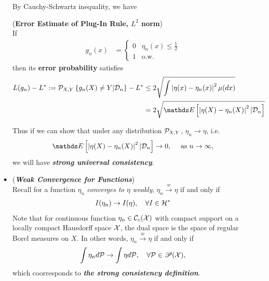 \documentclass[11pt]{article}
\begin{document}
\begin{itemize}
By Cauchy-Schwartz inequality, we have
\begin{corollary}(\textbf{Error Estimate of Plug-In Rule, $L^2$ norm}) \citep{devroye2013probabilistic} \\
If \begin{align*}
g_n(x) &= \left\{ \begin{array}{cc}
0 & \eta_n(x) \le \frac{1}{2}\\
1 & \text{o.w.}
\end{array}
\right.
\end{align*} then its \textbf{error probability} satisfies
\begin{align}
L(g_n) - L^{*}:= \cP_{X,Y}\set{g_n(X) \neq Y | \cD_n} - L^{*} &\le 2 \sqrt{\int \abs{\eta(x) - \eta_n(x)}^2 \mu(dx)} \nonumber\\
&=2\sqrt{\E{}{\abs{\eta(X) - \eta_n(X)}^2 | \cD_n}} \label{eqn: plug_in_error_estimate_l1}
\end{align}
\end{corollary}

Thus if we can show that under any distribution ${\mathcal P}_{X,Y}$, $\eta_n \rightarrow \eta$, i.e.
\begin{align*}
\E{}{\abs{\eta(X) - \eta_n(X)}^2 | \cD_n} \rightarrow 0, \quad \text{ as }n\rightarrow \infty,
\end{align*} we will have \emph{\textbf{strong universal consistency}}.

\item \begin{remark} (\emph{\textbf{Weak Convergence for Functions}})\\
Recall for a function $\eta_n$ \emph{converges to $\eta$ weakly}, $\eta_n \stackrel{w}{\rightarrow} \eta$ if and only if 
\begin{align*}
I(\eta_n) \rightarrow I(\eta), \quad \forall I \in {\mathcal H}^{*}
\end{align*} Note that for continuous function $\eta_n \in {\mathcal C}_c({\mathcal X})$ with compact support on a locally compact Hausdorff space ${\mathcal X}$, the dual space is the space of regular Borel measures on $X$. In other words, $\eta_n \stackrel{w}{\rightarrow} \eta$ if and only if 
\begin{align*}
\int \eta_n d{\mathcal P} \rightarrow \int \eta d{\mathcal P}, \quad \forall {\mathcal P} \in {\mathscr P}({\mathcal X}),
\end{align*} which coorresponds to \emph{\textbf{the strong consistency definition}}.
\end{remark}

\end{itemize}
\end{document}
